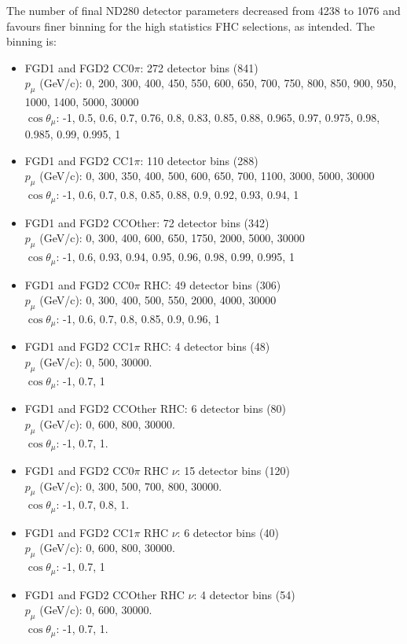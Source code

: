The number of final ND280 detector parameters decreased from 4238 to 1076 and favours finer binning for the high statistics FHC selections, as intended. The binning is:
\begin{itemize}
	\item FGD1 and FGD2 CC0$\pi$: 272 detector bins (841) \\
	$p_\mu$ (GeV/c): 0, 200, 300, 400, 450, 550, 600, 650, 700, 750, 800, 850, 900, 950, 1000, 1400, 5000, 30000\\
	$\cos\theta_\mu$: -1, 0.5, 0.6, 0.7, 0.76, 0.8, 0.83, 0.85, 0.88, 0.965, 0.97, 0.975, 0.98, 0.985, 0.99, 0.995, 1
	
	\item FGD1 and FGD2 CC1$\pi$: 110 detector bins (288) \\
	$p_\mu$ (GeV/c): 0, 300, 350, 400, 500, 600, 650, 700, 1100, 3000, 5000, 30000\\
	$\cos\theta_\mu$: -1, 0.6, 0.7, 0.8, 0.85, 0.88, 0.9, 0.92, 0.93, 0.94, 1
	
	\item FGD1 and FGD2 CCOther: 72 detector bins (342) \\
	$p_\mu$ (GeV/c): 0, 300, 400, 600, 650, 1750, 2000, 5000, 30000\\
	$\cos\theta_\mu$: -1, 0.6, 0.93, 0.94, 0.95, 0.96, 0.98, 0.99, 0.995, 1
	
	\item FGD1 and FGD2 CC0$\pi$ RHC: 49 detector bins (306) \\
	$p_\mu$ (GeV/c): 0, 300, 400, 500, 550, 2000, 4000, 30000\\
	$\cos\theta_\mu$: -1, 0.6, 0.7, 0.8, 0.85, 0.9, 0.96, 1 
	
	\item FGD1 and FGD2 CC1$\pi$ RHC: 4 detector bins (48) \\
	$p_\mu$ (GeV/c): 0, 500, 30000.\\
	$\cos\theta_\mu$: -1, 0.7, 1
	
	\item FGD1 and FGD2 CCOther RHC: 6 detector bins (80) \\
	$p_\mu$ (GeV/c): 0, 600, 800, 30000.\\
	$\cos\theta_\mu$: -1, 0.7, 1.
	
	\item FGD1 and FGD2 CC0$\pi$ RHC $\nu$: 15 detector bins (120) \\
	$p_\mu$ (GeV/c): 0, 300, 500, 700, 800, 30000.\\
	$\cos\theta_\mu$: -1, 0.7, 0.8, 1.
	
	\item FGD1 and FGD2 CC1$\pi$ RHC $\nu$: 6 detector bins (40) \\
	$p_\mu$ (GeV/c): 0, 600, 800, 30000.\\
	$\cos\theta_\mu$: -1, 0.7, 1
	
	\item FGD1 and FGD2 CCOther RHC $\nu$: 4 detector bins (54)\\
	$p_\mu$ (GeV/c): 0, 600, 30000.\\
	$\cos\theta_\mu$: -1, 0.7, 1.
\end{itemize}

